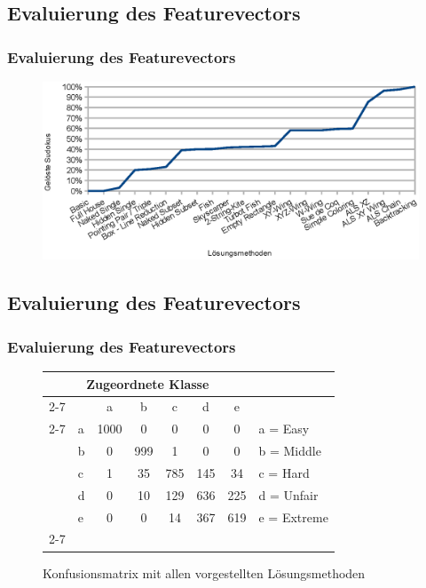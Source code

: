 \documentclass[accentcolor=tud6b,colorbacktitle,inverttitle,landscape,german,presentation,t]{tudbeamer}
\begin{document}
	\subsection{Evaluierung des Featurevectors}
		\begin{frame}
		\frametitle{Evaluierung des Featurevectors}
		\begin{figure}[Hh]
		\includegraphics[width=\textwidth,height=\textheight,keepaspectratio]{./img/solvedcount.eps}
		\end{figure}
		\end{frame}

	\subsection{Evaluierung des Featurevectors}
		\begin{frame}
		\frametitle{Evaluierung des Featurevectors}
		\begin{figure}[Hh]
		\centering
		\begin{tabular}{ l | l |  c  c  c  c  c | l}
		\multicolumn{7}{c}{\textbf{Zugeordnete Klasse}}\\
		\cline{2-7}
		\multirow{6}{*}{\begin{turn}{90}\textbf{Klasse}\end{turn}}
		 &  & a & b & c & d & e\\
		\cline{2-7}
		& a & 1000 & 0 & 0 & 0 & 0 & a = Easy \\
		& b & 0 & 999 & 1 & 0 & 0 & b = Middle \\
		& c & 1 & 35 & 785 & 145 & 34 & c = Hard \\
		& d & 0 & 10 & 129 & 636 & 225 & d = Unfair \\
		& e & 0 & 0 & 14 & 367 & 619 & e = Extreme \\
		\cline{2-7}
		\end{tabular}
		\caption{Konfusionsmatrix mit allen vorgestellten Lösungsmethoden}
		\end{figure}
		\end{frame}
\end{document}
